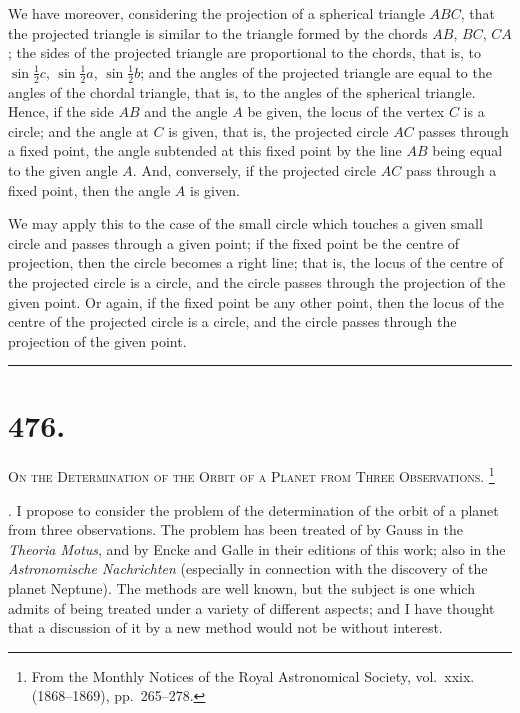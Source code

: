 \documentclass[11pt,a4paper]{article}
\theoremstyle{definition}
\begin{document}
\newpage
\noindent
We have moreover, considering the projection of a spherical triangle $ABC$, that the
projected triangle is similar to the triangle formed by the chords $AB$, $BC$, $CA$; the sides
of the projected triangle are proportional to the chords, that is, to $\sin\tfrac12c$, $\sin\tfrac12a$, $\sin\tfrac12b$;
and the angles of the projected triangle are equal to the angles of the chordal triangle,
that is, to the angles of the spherical triangle. Hence, if the side $AB$ and the angle $A$
be given, the locus of the vertex $C$ is a circle; and the angle at $C$ is given, that is, the
projected circle $AC$ passes through a fixed point, the angle subtended at this fixed point
by the line $AB$ being equal to the given angle $A$. And, conversely, if the projected
circle $AC$ pass through a fixed point, then the angle $A$ is given.

We may apply this to the case of the small circle which touches a given small circle
and passes through a given point; if the fixed point be the centre of projection, then
the circle becomes a right line; that is, the locus of the centre of the projected circle is
a circle, and the circle passes through the projection of the given point. Or again, if
the fixed point be any other point, then the locus of the centre of the projected circle is
a circle, and the circle passes through the projection of the given point.

\hfill\rule{1.5cm}{0.4pt}

\newpage

\section*{476.}
\markboth{ON THE DETERMINATION OF THE ORBIT \&C.}{476]}

\noindent\textsc{On the Determination of the Orbit of a Planet from Three
Observations.}%
\footnote{From the Monthly Notices of the Royal Astronomical Society, vol.~xxix. (1868--1869), pp.~265--278.}

\smallskip

. I propose to consider the problem of the determination of the orbit of a planet
from three observations. The problem has been treated of by Gauss in the \textit{Theoria Motus},
and by Encke and Galle in their editions of this work; also in the \textit{Astronomische Nachrichten}
(especially in connection with the discovery of the planet Neptune). The methods are well
known, but the subject is one which admits of being treated under a variety of different
aspects; and I have thought that a discussion of it by a new method would not be without
interest.
\end{document}
